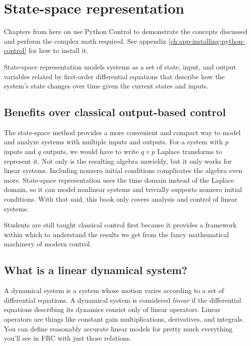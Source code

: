 
\chapter{State-space representation}

\begin{remark}
  Chapters from here on use Python Control to demonstrate the concepts discussed
  and perform the complex math required. See appendix
  \ref{ch:app-installing-python-control} for how to install it.
\end{remark}

State-space representation models \glspl{system} as a set of \gls{state}, input,
and output variables related by first-order differential equations that describe
how the system's state changes over time given the current \glspl{state} and
inputs.

\section{Benefits over classical output-based control}

The state-space method provides a more convenient and compact way to model and
analyze \glspl{system} with multiple inputs and outputs. For a system with $p$
inputs and $q$ outputs, we would have to write $q \times p$ Laplace transforms
to represent it. Not only is the resulting algebra unwieldy, but it only works
for linear systems. Including nonzero initial conditions complicates the algebra
even more. State-space representation uses the time domain instead of the
Laplace domain, so it can model nonlinear systems and trivially supports nonzero
initial conditions. With that said, this book only covers analysis and control
of linear systems.

Students are still taught classical control first because it provides a
framework within which to understand the results we get from the fancy
mathematical machinery of modern control.

\section{What is a linear dynamical system?}

A dynamical system is a system whose motion varies according to a set of
differential equations. A dynamical system is considered \textit{linear} if the
differential equations describing its dynamics consist only of linear operators.
Linear operators are things like constant gain multiplications, derivatives, and
integrals. You can define reasonably accurate linear models for pretty much
everything you'll see in FRC with just those relations.

